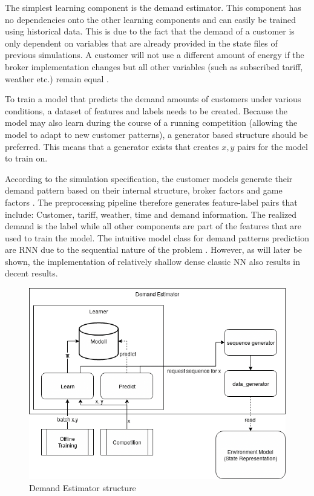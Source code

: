 The simplest learning component is the demand estimator. This component has no dependencies onto the other learning
components and can easily be trained using historical data. This is due to the fact that the demand of a customer is
only dependent on variables that are already provided in the state files of previous simulations. A customer will not
use a different amount of energy if the broker implementation changes but all other variables (such as subscribed
tariff, weather etc.) remain equal .

To train a model that predicts the demand amounts of customers under various conditions, a dataset of features and
labels needs to be created. Because the model may also learn during the course of a running competition (allowing the
model to adapt to new customer patterns), a generator based structure should be preferred. This means that a generator
exists that creates $x, y$ pairs for the model to train on.

According to the simulation specification, the customer models generate their demand pattern based on their internal
structure, broker factors and game factors \citep[]{ketter2018powertac}. The preprocessing pipeline therefore generates
feature-label pairs that include: Customer, tariff, weather, time and demand information. The realized demand is the
label while all other components are part of the features that are used to train the model. The intuitive model class
for demand patterns prediction are \ac {RNN} due to the sequential nature of the problem \citep[]{EvalGRU2014}. However,
as will later be shown, the implementation of relatively shallow dense classic \ac {NN} also results in decent results. 

\begin{figure}[h] \centering \includegraphics[width=0.8\linewidth]{img/UsageEstimator.png} \caption{Demand Estimator
structure} \label{fig:DemandEstimator} \end{figure}


